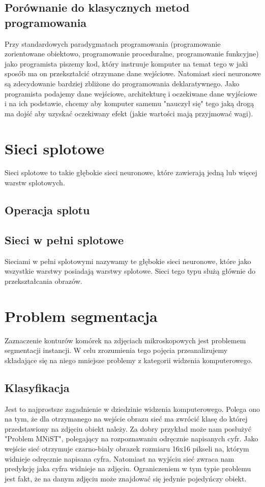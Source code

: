 \documentclass{article}
\begin{document}
\subsection{Porównanie do klasycznych metod programowania}
Przy standardowych paradygmatach programowania (programowanie zorientowane obiektowo, programowanie proceduralne, programowanie funkcyjne) jako programista piszemy kod, który
instruuje komputer na temat tego w jaki sposób ma on przekształcić otrzymane dane wejściowe.
Natomiast sieci neuronowe są zdecydowanie bardziej zbliżone do programowania deklaratywnego. Jako programista podajemy dane wejściowe, architekturę i oczekiwane dane wyjściowe i
na ich podstawie, chcemy aby komputer samemu "nauczył się" tego jaką drogą ma dojść aby uzyskać oczekiwany efekt (jakie wartości mają przyjmować wagi).
\newpage
\section{Sieci splotowe}
Sieci splotowe to takie głębokie sieci neuronowe, które zawierają jedną lub więcej warstw splotowych.
\subsection{Operacja splotu}
\subsection{Sieci w pełni splotowe}
Sieciami w pełni splotowymi nazywamy te głębokie sieci neuronowe, które jako wszystkie warstwy posiadają warstwy splotowe.
Sieci tego typu służą głównie do przekształcania obrazów.
\newpage
\section{Problem segmentacja}
Zaznaczenie konturów komórek na zdjęciach mikroskopowych jest problemem segmentacji instancji.
W celu zrozumienia tego pojęcia przeanalizujemy składające się na niego mniejsze problemy z kategorii widzenia komputerowego.
\subsection{Klasyfikacja}
Jest to najprostsze zagadnienie w dziedzinie widzenia komputerowego.
Polega ono na tym, że dla otrzymanego na wejście obrazu sieć ma zwrócić klasę do której przedstawiony na zdjęciu obiekt należy.
Za dobry przykład może nam posłużyć "Problem MNiST", polegający na rozpoznawaniu odręcznie napisanych cyfr.
Jako wejście sieć otrzymuje czarno-biały obrazek rozmiaru 16x16 pikseli na, którym widnieje odręcznie napisana cyfra.
Natomiast na wyjściu sieć zwraca nam predykcję jaka cyfra widnieje na zdjęciu.
Ograniczeniem w tym typie problemu jest fakt, że na danym zdjęciu może znajdować się jedynie pojedyńczy obiekt.
\end{document}
